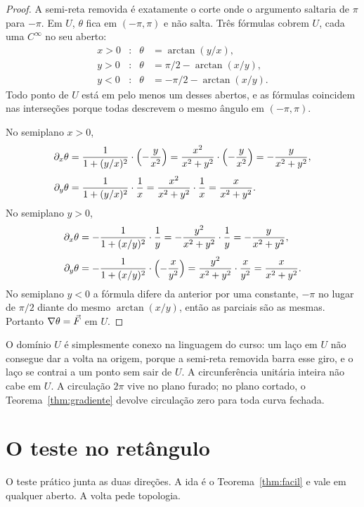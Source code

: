 \documentclass[11pt,a4paper]{article}
\begin{document}
\begin{proof}
A semi-reta removida é exatamente o corte onde o argumento saltaria de $\pi$ para $-\pi$. Em $U$, $\theta$ fica em $(-\pi,\pi)$ e não salta. Três fórmulas cobrem $U$, cada uma $C^\infty$ no seu aberto:
\begin{align*}
x>0&\colon & \theta&=\arctan(y/x),\\
y>0&\colon & \theta&=\pi/2-\arctan(x/y),\\
y<0&\colon & \theta&=-\pi/2-\arctan(x/y).
\end{align*}
Todo ponto de $U$ está em pelo menos um desses abertos, e as fórmulas coincidem nas interseções porque todas descrevem o mesmo ângulo em $(-\pi,\pi)$.

No semiplano $x>0$,
\begin{align*}
\partial_x\theta
&=\frac{1}{1+(y/x)^2}\cdot\Bigl(-\frac{y}{x^2}\Bigr)
=\frac{x^2}{x^2+y^2}\cdot\Bigl(-\frac{y}{x^2}\Bigr)
=-\frac{y}{x^2+y^2},\\[0.3em]
\partial_y\theta
&=\frac{1}{1+(y/x)^2}\cdot\frac{1}{x}
=\frac{x^2}{x^2+y^2}\cdot\frac{1}{x}
=\frac{x}{x^2+y^2}.
\end{align*}
No semiplano $y>0$,
\begin{align*}
\partial_x\theta
&=-\frac{1}{1+(x/y)^2}\cdot\frac{1}{y}
=-\frac{y^2}{x^2+y^2}\cdot\frac{1}{y}
=-\frac{y}{x^2+y^2},\\[0.3em]
\partial_y\theta
&=-\frac{1}{1+(x/y)^2}\cdot\Bigl(-\frac{x}{y^2}\Bigr)
=\frac{y^2}{x^2+y^2}\cdot\frac{x}{y^2}
=\frac{x}{x^2+y^2}.
\end{align*}
No semiplano $y<0$ a fórmula difere da anterior por uma constante, $-\pi$ no lugar de $\pi/2$ diante do mesmo $\arctan(x/y)$, então as parciais são as mesmas. Portanto $\nabla\theta=\vec{F}$ em $U$.
\end{proof}

O domínio $U$ é simplesmente conexo na linguagem do curso: um laço em $U$ não consegue dar a volta na origem, porque a semi-reta removida barra esse giro, e o laço se contrai a um ponto sem sair de $U$. A circunferência unitária inteira não cabe em $U$. A circulação $2\pi$ vive no plano furado; no plano cortado, o Teorema~\ref{thm:gradiente} devolve circulação zero para toda curva fechada.

\section{O teste no retângulo}

O teste prático junta as duas direções. A ida é o Teorema~\ref{thm:facil} e vale em qualquer aberto. A volta pede topologia.
\end{document}
